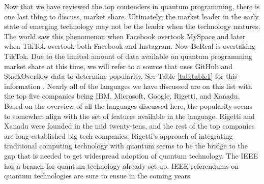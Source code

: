 \documentclass[conference]{IEEEtran}
\begin{document}
Now that we have reviewed the top contenders in quantum programming, there is one last thing to discuss, market share. 
Ultimately, the market leader in the early state of emerging technology may not be the leader when the technology matures. 
The world saw this phenomenon when Facebook overtook MySpace and later when TikTok overtook both Facebook and Instagram. 
Now BeReal is overtaking TikTok. 
Due to the limited amount of data available on quantum programming market share at this time, we will refer to a source that uses GitHub and StackOverflow data to determine popularity. 
See Table \ref{tab:table1} for this information \cite{b16}. 
Nearly all of the languages we have discussed are on this list with the top five companies being IBM, Microsoft, Google, Rigetti, and Xanadu. 
Based on the overview of all the languages discussed here, the popularity seems to somewhat align with the set of features available in the language. 
Rigetti and Xanadu were founded in the mid twenty-tens, and the rest of the top companies are long-established big tech companies. 
Rigetti's approach of integrating traditional computing technology with quantum seems to be the bridge to the gap that is needed to get widespread adoption of quantum technology. 
The IEEE has a branch for quantum technology already set up. 
IEEE referendums on quantum technologies are sure to ensue in the coming years.
\end{document}

